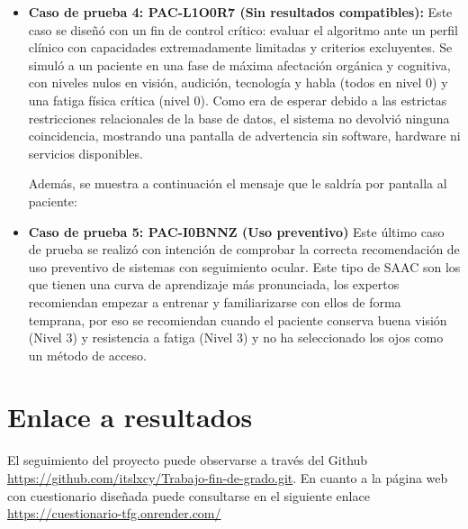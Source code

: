 \begin{itemize}
	\item \textbf{Caso de prueba 4: PAC-L1O0R7 (Sin resultados compatibles):} Este caso se diseñó con un fin de control crítico: evaluar el algoritmo ante un perfil clínico con capacidades extremadamente limitadas y criterios excluyentes. Se simuló a un  paciente en una fase de máxima 	afectación orgánica y cognitiva, con niveles nulos en visión, audición, tecnología y habla (todos en nivel 0) y una fatiga física crítica (nivel 0). 
    	Como era de esperar debido a las estrictas restricciones relacionales de la base de datos, el sistema no devolvió ninguna coincidencia, mostrando una pantalla de advertencia sin software, hardware ni servicios disponibles. 

	Además, se muestra a continuación el mensaje que le saldría por pantalla al paciente:

	\item \textbf{Caso de prueba 5: PAC-I0BNNZ (Uso preventivo)} Este último caso de prueba se realizó con intención de comprobar la correcta recomendación de uso preventivo de sistemas con seguimiento ocular. Este tipo de SAAC son los que tienen una curva de aprendizaje más 			pronunciada, los expertos recomiendan empezar a entrenar y familiarizarse con ellos de forma temprana, por eso se recomiendan cuando el paciente conserva buena visión (Nivel 3) y resistencia a fatiga (Nivel 3) y no ha seleccionado los ojos como un método de acceso.
\end{itemize}

\section{Enlace a resultados}
El seguimiento del proyecto puede observarse a través del Github \url{https://github.com/itslxcy/Trabajo-fin-de-grado.git}.
En cuanto a la página web con cuestionario diseñada puede consultarse en el siguiente enlace \url{https://cuestionario-tfg.onrender.com/}

